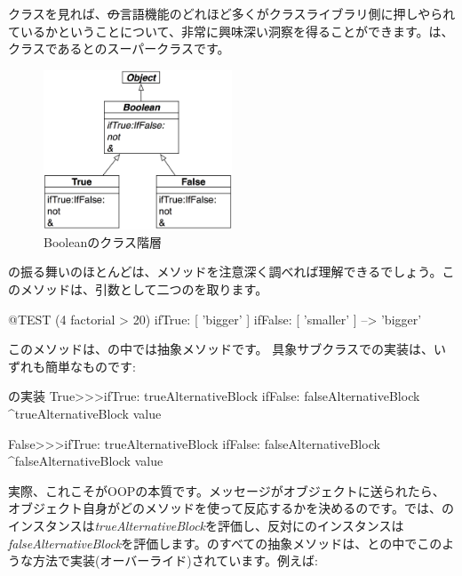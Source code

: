 \documentclass[a4paper,10pt,twoside]{book}
\begin{document}
クラスを見れば、\st の言語機能のどれほど多くがクラスライブラリ側に押しやられているかということについて、非常に興味深い洞察を得ることができます。は、クラスであるとのスーパークラスです。

\begin{figure}[ht]
  {\centerline {\includegraphics[width=0.5\textwidth]{BooleanHierarchy}}}
\caption{Booleanのクラス階層 }
\end{figure}

の振る舞いのほとんどは、メソッドを注意深く調べれば理解できるでしょう。このメソッドは、引数として二つのを取ります。

\begin{code}{@TEST}
(4 factorial > 20) ifTrue: [ 'bigger' ] ifFalse: [ 'smaller' ] --> 'bigger'
\end{code}

このメソッドは、の中では抽象メソッドです。
具象サブクラスでの実装は、いずれも簡単なものです:

\begin{method}{の実装}
True>>>ifTrue: trueAlternativeBlock ifFalse: falseAlternativeBlock 
    ^trueAlternativeBlock value

False>>>ifTrue: trueAlternativeBlock ifFalse: falseAlternativeBlock 
    ^falseAlternativeBlock value
\end{method}

実際、これこそがOOPの本質です。メッセージがオブジェクトに送られたら、オブジェクト自身がどのメソッドを使って反応するかを決めるのです。では、のインスタンスは\emph{trueAlternativeBlock}を評価し、反対にのインスタンスは\emph{falseAlternativeBlock}を評価します。のすべての抽象メソッドは、との中でこのような方法で実装(オーバーライド)されています。例えば:
\end{document}
